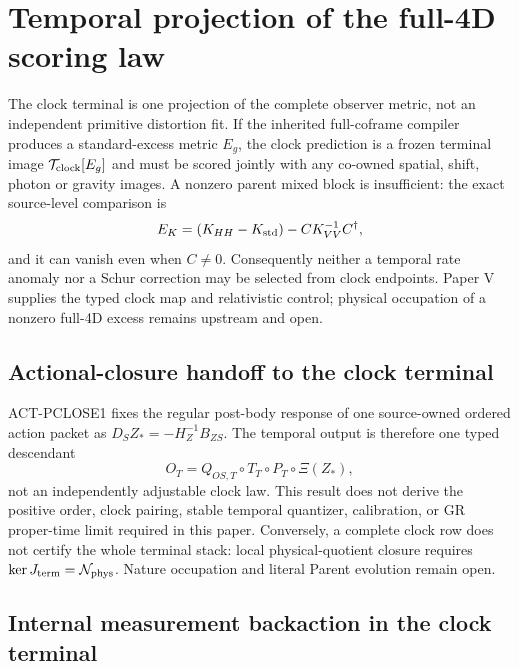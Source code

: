 \documentclass[11pt]{article}
\begin{document}
\section{Temporal projection of the full-4D scoring law}

The clock terminal is one projection of the complete observer metric, not an
independent primitive distortion fit.  If the inherited full-coframe compiler
produces a standard-excess metric \(E_g\), the clock prediction is a frozen
terminal image \(\mathcal T_{\rm clock}[E_g]\) and must be scored jointly with
any co-owned spatial, shift, photon or gravity images.  A nonzero parent mixed
block is insufficient: the exact source-level comparison is
\[
 E_K=(K_{HH}-K_{\rm std})-CK_{VV}^{-1}C^\dagger,
\]
and it can vanish even when \(C\neq0\).  Consequently neither a temporal
rate anomaly nor a Schur correction may be selected from clock endpoints.
Paper V supplies the typed clock map and relativistic control; physical
occupation of a nonzero full-4D excess remains upstream and open.

\subsection*{Actional-closure handoff to the clock terminal}

ACT-PCLOSE1 fixes the regular post-body response of one source-owned ordered
action packet as $D_SZ_*=-H_Z^{-1}B_{ZS}$.  The temporal output is therefore
one typed descendant
\[
 O_T=Q_{OS,T}\circ T_T\circ P_T\circ\Xi(Z_*),
\]
not an independently adjustable clock law.  This result does not derive the
positive order, clock pairing, stable temporal quantizer, calibration, or GR
proper-time limit required in this paper.  Conversely, a complete clock row
does not certify the whole terminal stack: local physical-quotient closure
requires $\ker J_{\rm term}=\mathcal N_{\rm phys}$.  Nature occupation and
literal Parent evolution remain open.

\subsection*{Internal measurement backaction in the clock terminal}
\end{document}
